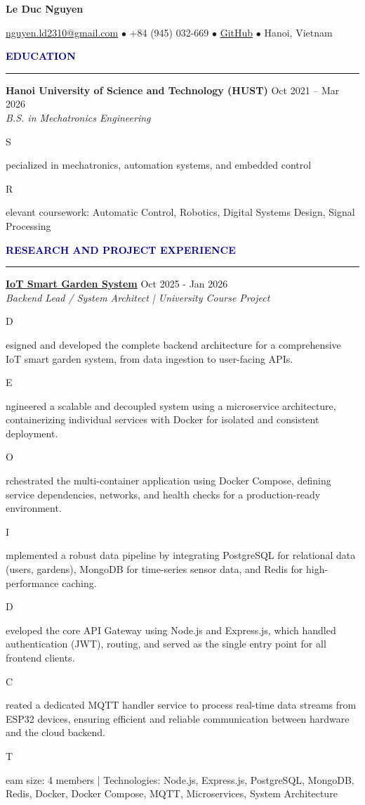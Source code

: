 \documentclass[11pt,letterpaper]{article}
\newcommand{\name}[1]{
  \centerline{\Large\textbf{#1}}
  \vspace{0.5em}
}
\newcommand{\contact}[4]{
  \centerline{\small #1 \quad $\bullet$ \quad #2 \quad $\bullet$ \quad #3 \quad $\bullet$ \quad #4}
  \vspace{1em}
}
\newcommand{\section}[1]{
  \vspace{0.3em}
  {\large\textbf{\textcolor{darkblue}{#1}}}
  \vspace{0.2em}
  \hrule
  \vspace{0.3em}
}
\newcommand{\entry}[4]{
  \textbf{#1} \hfill #2 \\
  \textit{#3} \\
  #4
  \vspace{0.3em}
}
\newcommand{\item}[1]{
  \begin{itemize}[leftmargin=1.5em, topsep=0pt, itemsep=0.2em]
    #1
  \end{itemize}
}
\begin{document}
\name{Le Duc Nguyen}

\contact
  {\href{mailto:nguyen.ld2310@gmail.com}{nguyen.ld2310@gmail.com}}
  {+84 (945) 032-669}
  {\href{https://github.com/AndrewHaward2310}{GitHub}}
  {Hanoi, Vietnam}

\section{EDUCATION}

\entry
  {Hanoi University of Science and Technology (HUST)}
  {Oct 2021 -- Mar 2026}
  {B.S. in Mechatronics Engineering}
  {
    \begin{itemize}[leftmargin=1.5em, topsep=0pt, itemsep=0.2em]
      \item Specialized in mechatronics, automation systems, and embedded control
      \item Relevant coursework: Automatic Control, Robotics, Digital Systems Design, Signal Processing
    \end{itemize}
  }

\section{RESEARCH AND PROJECT EXPERIENCE}

\entry
  {\href{https://github.com/AndrewHaward2310/IoTSmartGardenSystem}{IoT Smart Garden System}}
  {Oct 2025 - Jan 2026}
  {Backend Lead / System Architect | University Course Project}
  {
    \begin{itemize}[leftmargin=1.5em, topsep=0pt, itemsep=0.2em]
      \item Designed and developed the complete backend architecture for a comprehensive IoT smart garden system, from data ingestion to user-facing APIs.
      \item Engineered a scalable and decoupled system using a microservice architecture, containerizing individual services with Docker for isolated and consistent deployment.
      \item Orchestrated the multi-container application using Docker Compose, defining service dependencies, networks, and health checks for a production-ready environment.
      \item Implemented a robust data pipeline by integrating PostgreSQL for relational data (users, gardens), MongoDB for time-series sensor data, and Redis for high-performance caching.
      \item Developed the core API Gateway using Node.js and Express.js, which handled authentication (JWT), routing, and served as the single entry point for all frontend clients.
      \item Created a dedicated MQTT handler service to process real-time data streams from ESP32 devices, ensuring efficient and reliable communication between hardware and the cloud backend.
      \item Team size: 4 members | Technologies: Node.js, Express.js, PostgreSQL, MongoDB, Redis, Docker, Docker Compose, MQTT, Microservices, System Architecture
    \end{itemize}
  }
\end{document}
